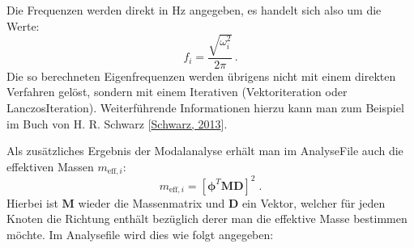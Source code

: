 \documentclass[letterpaper,10pt,german]{jupyterBook}
\begin{document}
\sphinxAtStartPar
Die Frequenzen werden direkt in Hz angegeben, es handelt sich also um die Werte:
\label{equation:chapters/chapter6/Modalanalyse:c52e7bea-99cf-4aa1-a643-86a11cc80fc0}\begin{equation}
 f_i = \frac{\sqrt{\omega_i^2}}{2\pi} \, .
\end{equation}
\sphinxAtStartPar
Die so berechneten Eigenfrequenzen werden übrigens nicht mit einem direkten Verfahren gelöst, sondern mit einem Iterativen (Vektoriteration oder Lanczos\sphinxhyphen{}Iteration). Weiterführende Informationen hierzu kann man zum Beispiel im Buch von H. R. Schwarz {[}\hyperlink{cite.quellen:id20}{Schwarz, 2013}{]}.

\sphinxAtStartPar
Als zusätzliches Ergebnis der Modalanalyse erhält man im Analyse\sphinxhyphen{}File auch die effektiven Massen \(m_{\text{eff},i}\):
\label{equation:chapters/chapter6/Modalanalyse:36fbd641-7ec7-4293-8fbf-1310af261828}\begin{equation}
m_{\text{eff},i} = \left[  \bm{\phi}^T \bm{M} \bm{D}\right]^2 \; .
\end{equation}
\sphinxAtStartPar
Hierbei ist \(\bm{M}\) wieder die Massenmatrix und \(\bm{D}\) ein Vektor, welcher für jeden Knoten die Richtung enthält bezüglich derer man die effektive Masse bestimmen möchte. Im Analyse\sphinxhyphen{}file wird dies wie folgt angegeben:
\end{document}
